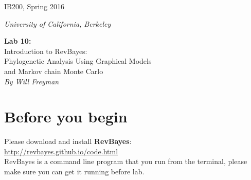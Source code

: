 \documentclass[11pt]{article}
\begin{document}
\noindent
\large
\begin{minipage}{0.5\textwidth}
\begin{flushleft} 
IB200, Spring 2016
\end{flushleft}
\end{minipage}
\begin{minipage}{0.5\textwidth}
\begin{flushright} 
\textit{University of California, Berkeley}
\end{flushright}
\end{minipage}

\vspace{0.5cm}


\begin{center}
\Large \textbf{Lab 10:} \\
Introduction to RevBayes: \\
Phylogenetic Analysis Using Graphical Models \\
and Markov chain Monte Carlo \\
\normalsize
\textit{By Will Freyman}
\end{center}

\vspace{0.5cm}

\section{Before you begin}

Please download and install \textbf{RevBayes}: \\
\url{http://revbayes.github.io/code.html} \\
RevBayes is a command line program that you run from the terminal,
please make sure you can get it running before lab.
\end{document}
